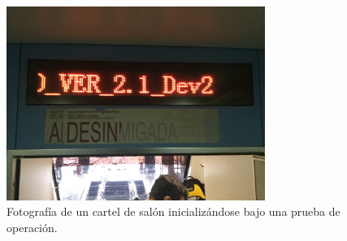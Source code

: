 \begin{figure}[ht]
	\centering
	\includegraphics[width=0.75\textwidth]{./Figures/cartelIniciando.JPG}
	\caption{Fotografía de un cartel de salón inicializándose bajo una prueba de operación.}
	\label{fig:cartelIniciando}
\end{figure}
